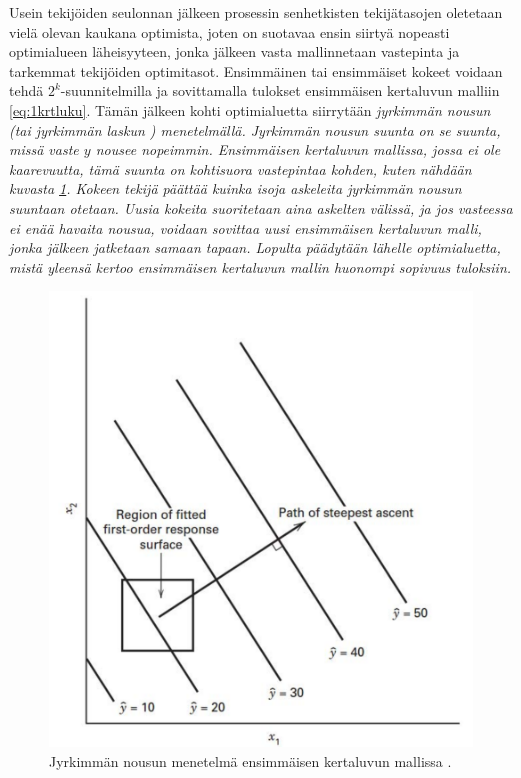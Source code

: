 \documentclass[12pt,a4paper,finnish]{tutthesis}
\begin{document}
Usein tekijöiden seulonnan jälkeen prosessin senhetkisten tekijätasojen oletetaan
vielä olevan kaukana optimista, joten on suotavaa ensin siirtyä nopeasti optimialueen
läheisyyteen, jonka jälkeen vasta mallinnetaan vastepinta ja tarkemmat tekijöiden
optimitasot. Ensimmäinen tai ensimmäiset kokeet voidaan tehdä $2^k$-suunnitelmilla
ja  sovittamalla tulokset ensimmäisen kertaluvun malliin \ref{eq:1krtluku}.
Tämän jälkeen kohti optimialuetta siirrytään \em jyrkimmän nousun \em
(tai \em jyrkimmän laskun \em) menetelmällä. Jyrkimmän nousun suunta on se
suunta, missä vaste $y$ nousee nopeimmin. Ensimmäisen kertaluvun mallissa,
jossa ei ole kaarevuutta, tämä suunta on kohtisuora vastepintaa kohden, kuten
nähdään kuvasta \ref{fig:steepest}. Kokeen tekijä päättää
kuinka isoja askeleita jyrkimmän nousun suuntaan otetaan. Uusia kokeita suoritetaan
aina askelten välissä, ja jos vasteessa ei enää havaita nousua, voidaan sovittaa
uusi ensimmäisen kertaluvun malli, jonka jälkeen jatketaan samaan tapaan.
Lopulta päädytään lähelle optimialuetta, mistä yleensä kertoo ensimmäisen kertaluvun mallin
huonompi sopivuus tuloksiin.

\begin{figure}
  \begin{center}
    \includegraphics[scale=0.6]{steepest}
  \end{center}
  \caption[Jyrkimmän nousun menetelmä]{Jyrkimmän nousun menetelmä ensimmäisen kertaluvun mallissa \parencite[s.~481]{Montgomery2012}.}
  \label{fig:steepest}
\end{figure}
\end{document}
